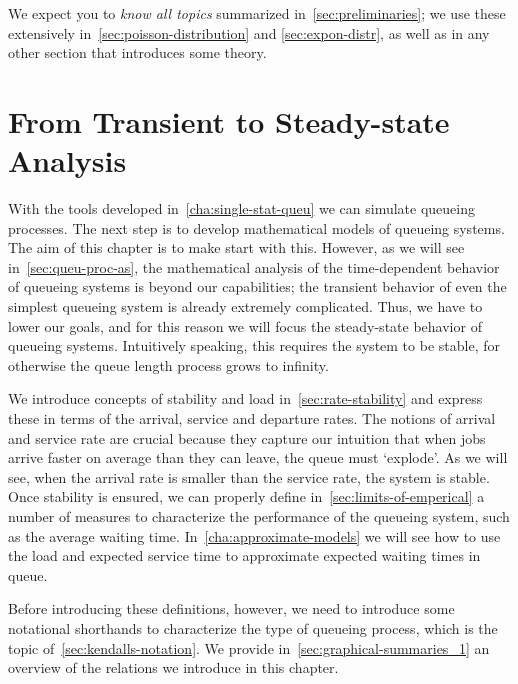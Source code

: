 We expect you to \emph{know all topics} summarized in~\cref{sec:preliminaries}; we use these extensively in~\cref{sec:poisson-distribution} and \cref{sec:expon-distr}, as well as in any other section that introduces some theory.






\chapter{From Transient to Steady-state Analysis}
\label{cha:from-trans-steady}


With the tools developed in~\cref{cha:single-stat-queu} we can simulate queueing processes.
The next step is to develop mathematical models of queueing systems.
The aim of this chapter is to make start with this.
However, as we will see in~\cref{sec:queu-proc-as}, the mathematical analysis of the time-dependent behavior of queueing systems is beyond our capabilities; the transient behavior of even the simplest queueing system is already extremely complicated.
Thus, we have to lower our goals, and for this reason we will focus the steady-state behavior of queueing systems.
Intuitively speaking, this requires the system to be stable, for otherwise the queue length process grows to infinity.

We introduce concepts of stability and load in~\cref{sec:rate-stability} and express these in terms of the arrival, service and departure rates.
The notions of arrival and service rate are crucial because they capture our intuition that when jobs arrive faster on average than they can leave, the queue must `explode'.
As we will see, when the arrival rate is smaller than the service rate, the system is stable.
Once stability is ensured, we can properly define in~\cref{sec:limits-of-emperical} a number of measures to characterize the performance of the queueing system, such as the average waiting time.
In~\cref{cha:approximate-models} we will see how to use the load and expected service time to approximate expected waiting times in queue. 

Before introducing these definitions, however, we need to introduce some notational shorthands to characterize the type of queueing process, which is the topic of~\cref{sec:kendalls-notation}.
We provide in~\cref{sec:graphical-summaries_1} an overview of the relations we introduce in this chapter.


